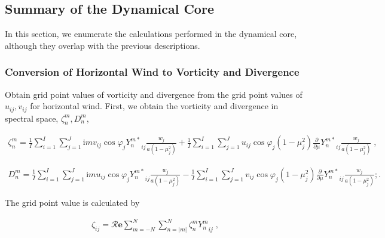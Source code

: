 \hypertarget{summary-of-the-dynamical-core}{%
\subsection{Summary of the Dynamical
Core}\label{summary-of-the-dynamical-core}}

In this section, we enumerate the calculations performed in the
dynamical core, although they overlap with the previous descriptions.

\hypertarget{conversion-of-horizontal-wind-to-vorticity-and-divergence}{%
\subsubsection{Conversion of Horizontal Wind to Vorticity and
Divergence}\label{conversion-of-horizontal-wind-to-vorticity-and-divergence}}

Obtain grid point values of vorticity and divergence from the grid point
values of \(u_{ij}, v_{ij}\) for horizontal wind. First, we obtain the
vorticity and divergence in spectral space, \(\zeta_n^m, D_n^m\),

\begin{eqnarray}
\zeta_n^m  =  \frac{1}{I} \sum_{i=1}^{I} \sum_{j=1}^{J}  
                  \mathrm{i}m v_{ij} \cos\varphi_j {Y_n^{m*}}_{ij}
                \frac{w_j}{a(1-\mu_j^{2})}
           +    \frac{1}{I} \sum_{i=1}^{I} \sum_{j=1}^{J}  
                     u_{ij} \cos\varphi_j (1-\mu_j^2)
                  \frac{\partial }{\partial \mu} {Y_n^{m*}}_{ij}
                 \frac{w_j}{a(1-\mu_j^{2})} \; ,
\end{eqnarray}

\begin{eqnarray}
    D_n^m  =  \frac{1}{I} \sum_{i=1}^{I} \sum_{j=1}^{J}  
                  \mathrm{i}m u_{ij} \cos\varphi_j {Y_n^{m*}}_{ij}
                \frac{w_j}{a(1-\mu_j^{2})}
           -    \frac{1}{I} \sum_{i=1}^{I} \sum_{j=1}^{J}  
                  v_{ij} \cos\varphi_j  (1-\mu_j^2)
                  \frac{\partial }{\partial \mu} {Y_n^{m*}}_{ij}
                 \frac{w_j}{a(1-\mu_j^{2})} ; .
\end{eqnarray}

The grid point value is calculated by

\begin{eqnarray}
  \zeta_{ij}
   =  {\mathcal R}{\mathbf{e}} \sum_{m=-N}^{N} \sum_{n=|m|}^{N}
      \zeta_n^m  {Y_n^m}_{ij} \; ,
\end{eqnarray}

